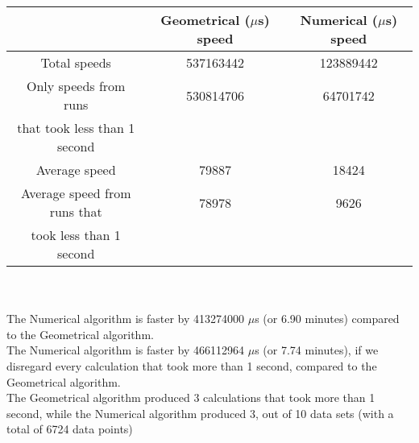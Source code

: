 \begin{tabular}[3]{c|c|c}
 & Geometrical ($\mu$s) speed & Numerical ($\mu$s) speed\\
\hline
Total speeds & 537163442 & 123889442 \\ 
\hline 
Only speeds from runs & 530814706 & 64701742 \\ 
that took less than 1 second & & \\ 
\hline
Average speed & 79887 & 18424 \\
\hline
Average speed from runs that & 78978 & 9626 \\ 
took less than 1 second & & \\ 
\end{tabular}\\ \\
The Numerical algorithm is faster by 413274000 $\mu$s (or 6.90 minutes) compared to the Geometrical algorithm.\\
The Numerical algorithm is faster by 466112964 $\mu$s (or 7.74 minutes), if we disregard every calculation that took more than 1 second, compared to the Geometrical algorithm.\\
The Geometrical algorithm produced 3 calculations that took more than 1 second, while the Numerical algorithm produced 3, out of 10 data sets (with a total of 6724 data points)\\

